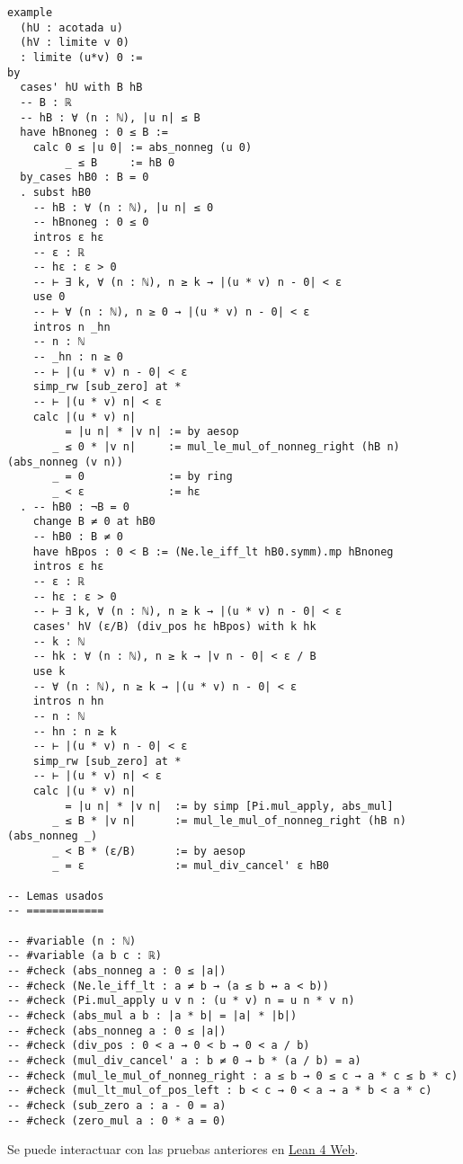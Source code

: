 \begin{verbatim}
example
  (hU : acotada u)
  (hV : limite v 0)
  : limite (u*v) 0 :=
by
  cases' hU with B hB
  -- B : ℝ
  -- hB : ∀ (n : ℕ), |u n| ≤ B
  have hBnoneg : 0 ≤ B :=
    calc 0 ≤ |u 0| := abs_nonneg (u 0)
         _ ≤ B     := hB 0
  by_cases hB0 : B = 0
  . subst hB0
    -- hB : ∀ (n : ℕ), |u n| ≤ 0
    -- hBnoneg : 0 ≤ 0
    intros ε hε
    -- ε : ℝ
    -- hε : ε > 0
    -- ⊢ ∃ k, ∀ (n : ℕ), n ≥ k → |(u * v) n - 0| < ε
    use 0
    -- ⊢ ∀ (n : ℕ), n ≥ 0 → |(u * v) n - 0| < ε
    intros n _hn
    -- n : ℕ
    -- _hn : n ≥ 0
    -- ⊢ |(u * v) n - 0| < ε
    simp_rw [sub_zero] at *
    -- ⊢ |(u * v) n| < ε
    calc |(u * v) n|
         = |u n| * |v n| := by aesop
       _ ≤ 0 * |v n|     := mul_le_mul_of_nonneg_right (hB n) (abs_nonneg (v n))
       _ = 0             := by ring
       _ < ε             := hε
  . -- hB0 : ¬B = 0
    change B ≠ 0 at hB0
    -- hB0 : B ≠ 0
    have hBpos : 0 < B := (Ne.le_iff_lt hB0.symm).mp hBnoneg
    intros ε hε
    -- ε : ℝ
    -- hε : ε > 0
    -- ⊢ ∃ k, ∀ (n : ℕ), n ≥ k → |(u * v) n - 0| < ε
    cases' hV (ε/B) (div_pos hε hBpos) with k hk
    -- k : ℕ
    -- hk : ∀ (n : ℕ), n ≥ k → |v n - 0| < ε / B
    use k
    -- ∀ (n : ℕ), n ≥ k → |(u * v) n - 0| < ε
    intros n hn
    -- n : ℕ
    -- hn : n ≥ k
    -- ⊢ |(u * v) n - 0| < ε
    simp_rw [sub_zero] at *
    -- ⊢ |(u * v) n| < ε
    calc |(u * v) n|
         = |u n| * |v n|  := by simp [Pi.mul_apply, abs_mul]
       _ ≤ B * |v n|      := mul_le_mul_of_nonneg_right (hB n) (abs_nonneg _)
       _ < B * (ε/B)      := by aesop
       _ = ε              := mul_div_cancel' ε hB0

-- Lemas usados
-- ============

-- #variable (n : ℕ)
-- #variable (a b c : ℝ)
-- #check (abs_nonneg a : 0 ≤ |a|)
-- #check (Ne.le_iff_lt : a ≠ b → (a ≤ b ↔ a < b))
-- #check (Pi.mul_apply u v n : (u * v) n = u n * v n)
-- #check (abs_mul a b : |a * b| = |a| * |b|)
-- #check (abs_nonneg a : 0 ≤ |a|)
-- #check (div_pos : 0 < a → 0 < b → 0 < a / b)
-- #check (mul_div_cancel' a : b ≠ 0 → b * (a / b) = a)
-- #check (mul_le_mul_of_nonneg_right : a ≤ b → 0 ≤ c → a * c ≤ b * c)
-- #check (mul_lt_mul_of_pos_left : b < c → 0 < a → a * b < a * c)
-- #check (sub_zero a : a - 0 = a)
-- #check (zero_mul a : 0 * a = 0)
\end{verbatim}
Se puede interactuar con las pruebas anteriores en \href{https://lean.math.hhu.de/\#url=https://raw.githubusercontent.com/jaalonso/Calculemus2/main/src/Producto\_de\_una\_sucesion\_acotada\_por\_otra\_convergente\_a\_cero.lean}{Lean 4 Web}.

